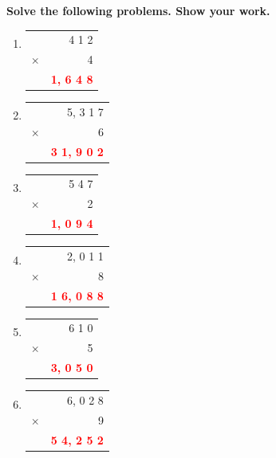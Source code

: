\documentclass[11pt, a4paper]{article}
\newcommand{\answerline}[1]{\textcolor{red}{\textbf{#1}}}
\begin{document}
\begin{center}
\end{center}

\vspace{1cm}

\textbf{Solve the following problems. Show your work.}

\begin{enumerate}[label=\arabic*.]
    \item \begin{tabular}[t]{c r}
          & 4 1 2 \\
        $\times$ & 4 \\ \hline
          & \answerline{1, 6 4 8} \\ \hline
    \end{tabular}
    \hfill
    \setcounter{enumi}{5}
    \item \begin{tabular}[t]{c r}
          & 5, 3 1 7 \\
        $\times$ & 6 \\ \hline
          & \answerline{3 1, 9 0 2} \\ \hline
    \end{tabular}

    \vspace{1cm}
    \setcounter{enumi}{1}
    \item \begin{tabular}[t]{c r}
          & 5 4 7 \\
        $\times$ & 2 \\ \hline
          & \answerline{1, 0 9 4} \\ \hline
    \end{tabular}
    \hfill
    \setcounter{enumi}{6}
    \item \begin{tabular}[t]{c r}
          & 2, 0 1 1 \\
        $\times$ & 8 \\ \hline
          & \answerline{1 6, 0 8 8} \\ \hline
    \end{tabular}

    \vspace{1cm}
    \setcounter{enumi}{2}
    \item \begin{tabular}[t]{c r}
          & 6 1 0 \\
        $\times$ & 5 \\ \hline
          & \answerline{3, 0 5 0} \\ \hline
    \end{tabular}
    \hfill
    \setcounter{enumi}{7}
    \item \begin{tabular}[t]{c r}
          & 6, 0 2 8 \\
        $\times$ & 9 \\ \hline
          & \answerline{5 4, 2 5 2} \\ \hline
    \end{tabular}


\end{enumerate}
\end{document}
